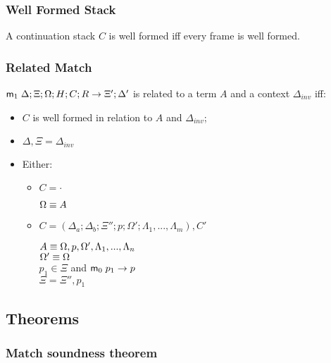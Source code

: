 \subsubsection{Well Formed Stack}

A continuation stack $C$ is well formed iff every frame is well formed.

\subsubsection{Related Match}\label{sec:related_match}

$\mathsf{m}_1 \; \Delta; \Xi; \Omega; H; C; R \rightarrow \Xi'; \Delta'$ is related to a term $A$ and a context $\Delta_{inv}$ iff:

\begin{itemize}
   \item $C$ is well formed in relation to $A$ and $\Delta_{inv}$;
   \item $\Delta, \Xi = \Delta_{inv}$
   \item Either:
   \begin{itemize}
      \item $C = \cdot$
   
      $\Omega \equiv A$
   
      \item $C = (\Delta_a; \Delta_b; \Xi''; p; \Omega'; \Lambda_1, ..., \Lambda_m), C'$
   
      $A \equiv \Omega, p, \Omega', \Lambda_1, ..., \Lambda_n$ \\
      $\Omega' \equiv \Omega$ \\ 
      $p_1 \in \Xi$ and $\mathsf{m}_0 \; p_1 \rightarrow p$ \\
      $\Xi = \Xi'', p_1$ \\
   \end{itemize}
\end{itemize}

\subsection{Theorems}

\subsubsection{Match soundness theorem}\label{thm:match_soundness_basic}


